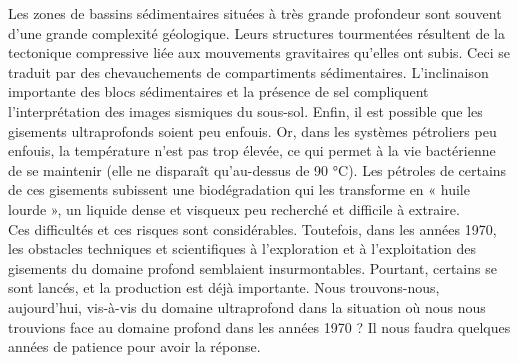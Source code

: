 \documentclass[8pt]{article}
\begin{document}
Les zones de bassins sédimentaires situées à très grande profondeur sont souvent d'une grande complexité géologique. Leurs structures tourmentées résultent de la tectonique compressive liée aux mouvements gravitaires qu'elles ont subis. Ceci se traduit par des chevauchements de compartiments sédimentaires. L'inclinaison importante des blocs sédimentaires et la présence de sel compliquent l'interprétation des images sismiques du sous-sol. Enfin, il est possible que les gisements ultraprofonds soient peu enfouis. Or, dans les systèmes pétroliers peu enfouis, la température n'est pas trop élevée, ce qui permet à la vie bactérienne de se maintenir (elle ne disparaît qu'au-dessus de 90 °C). Les pétroles de certains de ces gisements subissent une biodégradation qui les transforme en « huile lourde », un liquide dense et visqueux peu recherché et difficile à extraire.\\

Ces difficultés et ces risques sont considérables. Toutefois, dans les années 1970, les obstacles techniques et scientifiques à l'exploration et à l'exploitation des gisements du domaine profond semblaient insurmontables. Pourtant, certains se sont lancés, et la production est déjà importante. Nous trouvons-nous, aujourd'hui, vis-à-vis du domaine ultraprofond dans la situation où nous nous trouvions face au domaine profond dans les années 1970 ? Il nous faudra quelques années de patience pour avoir la réponse.
\end{document}
